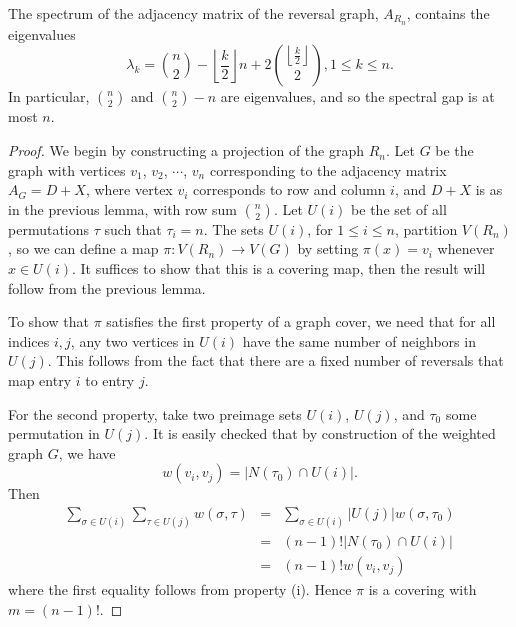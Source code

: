 \begin{lemma}\label{lem:rev_eig2}
  The spectrum of the adjacency matrix of the reversal graph, $A_{R_n}$, 
  contains the eigenvalues
\[ \lambda_k =  \binom{n}{2} - \left\lfloor \frac{k}{2} \right\rfloor n + 2 \binom{\left \lfloor \frac{k}{2} \right \rfloor}{2}, 1 \leq k \leq n . \]
  In particular, $\binom{n}{2}$ and $\binom{n}{2} - n$ are eigenvalues, and so the spectral gap is at most $n$. 
\end{lemma}  

\begin{proof}
  We begin by constructing a projection of the graph $R_n$.
  Let $G$ be the graph with vertices $v_1$, $v_2$, $\cdots$,
  $v_n$ corresponding to the adjacency matrix $A_G = D+X$,
  where vertex $v_i$ corresponds to row and column $i$, and
  $D+X$ is as in the previous lemma, with row sum $\binom{n}{2}$.
  Let $U(i)$ be the set of all permutations $\tau$ such that $\tau_i = n$.
  The sets $U(i)$, for $1\leq i \leq n$, partition $V(R_n)$, so we
  can define a map $\pi : V(R_n) \to V(G)$ by
  setting $\pi(x) = v_i$ whenever $x \in U(i)$.  It suffices to show
  that this is a covering map, then the result will follow
  from the previous lemma.


  To show that $\pi$ satisfies the first property of a graph cover,
  we need that for all indices $i,j$, any two vertices in $U(i)$
  have the same number of neighbors in $U(j)$.  This follows from the
  fact that there are a fixed number of reversals that map
  entry $i$ to entry $j$.



  For the second property, take two preimage sets $U(i)$, $U(j)$,
  and $\tau_0$ some permutation in $U(j)$.  It is easily checked
  that by construction of the weighted graph $G$, we have
  \[ w(v_i, v_j) = \left| N(\tau_0) \cap U(i) \right| .\]
  Then
  \begin{eqnarray*}
    \displaystyle \sum_{\sigma \in U(i)} \sum_{\tau \in U(j)} w(\sigma,\tau) & = & \sum_{\sigma \in U(i)} |U(j)| w(\sigma,\tau_0) \\
    & = & (n-1)! \left| N(\tau_0) \cap U(i) \right|  \\
    & = & (n-1)! w(v_i, v_j)
  \end{eqnarray*}
  where the first equality follows from property (i).
  Hence $\pi$ is a covering with $m = (n-1)!$.


\end{proof}
